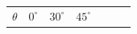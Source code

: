 {\begin{center}
      \label{m39414*id89593}
      
    \noindent
      \tablelasttail{}
      \begin{xtabular*}{\mytablewidth}[t]{|p{10\mystarwidth}|p{10\mystarwidth}|p{10\mystarwidth}|p{10\mystarwidth}|p{10\mystarwidth}|p{10\mystarwidth}|p{10\mystarwidth}|}\hline
    
    
        
                  \begin{math}\theta \end{math}
                 &
    
    
        
                  \begin{math}{0}^{\circ }\end{math}
                 &
    
    
        
                  \begin{math}{30}^{\circ }\end{math}
                 &
    
    
        
                  \begin{math}{45}^{\circ }\end{math}
                 &
    
    
        

\end{xtabular*}
\end{center}}
